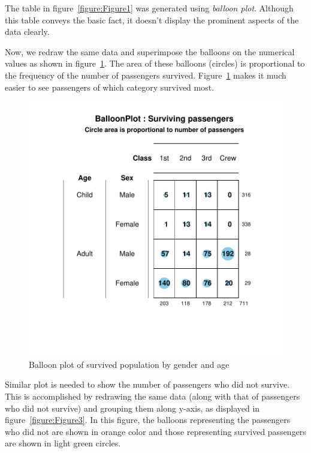 \documentclass[a4paper]{report}
\begin{document}
\begin{article}
The table in figure~\ref{figure:Figure1} was generated using
\emph{balloon plot}. Although this table conveys the basic fact, it
doesn't display the prominent aspects of the data clearly.

Now, we redraw the same data and superimpose the balloons on the
numerical values as shown in figure~\ref{figure:Figure2}. The area
of these balloons (circles) is proportional to the frequency of the
number of passengers survived. Figure~\ref{figure:Figure2} makes it
much easier to see passengers of which category survived most.


\begin{figure}
\includegraphics[width=\textwidth]{Figure2.pdf}
\caption{\label{figure:Figure2}
Balloon plot of survived population by gender and age }
\end{figure}

Similar plot is needed to show the number of passengers who did
not survive. This is accomplished by redrawing the same data (along
with that of passengers who did not survive) and grouping them along
y-axis, as displayed in figure~\ref{figure:Figure3}.
In this figure, the balloons representing the passengers who did
not are shown in orange color and those representing survived
passengers are shown in light green circles.




\end{article}
\end{document}
